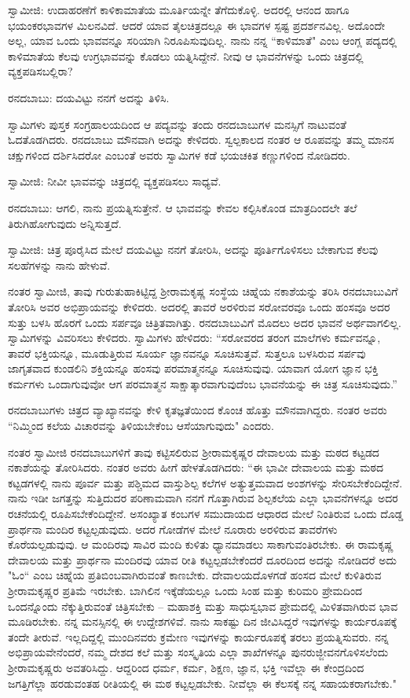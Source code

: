 ಸ್ವಾಮೀಜಿ: ಉದಾಹರಣೆಗೆ ಕಾಳಿಕಾಮಾತೆಯ ಮೂರ್ತಿಯನ್ನೇ ತೆಗೆದುಕೊಳ್ಳಿ. ಅದರಲ್ಲಿ ಆನಂದ ಹಾಗೂ ಭಯಂಕರಭಾವಗಳ ಮಿಲನವಿದೆ. ಆದರೆ ಯಾವ ತೈಲಚಿತ್ರದಲ್ಲೂ ಈ ಭಾವಗಳ ಸ್ಪಷ್ಟ ಪ್ರದರ್ಶನವಿಲ್ಲ. ಅದೊಂದೇ ಅಲ್ಲ, ಯಾವ ಒಂದು ಭಾವವನ್ನೂ ಸರಿಯಾಗಿ ನಿರೂಪಿಸುವುದಿಲ್ಲ. ನಾನು ನನ್ನ “ಕಾಳಿಮಾತೆ" ಎಂಬ ಆಂಗ್ಲ ಪದ್ಯದಲ್ಲಿ ಕಾಳಿಮಾತೆಯ ಕೆಲವು ಉಗ್ರಭಾವವನ್ನು ಕೊಡಲು ಯತ್ನಿಸಿದ್ದೇನೆ. ನೀವು ಆ ಭಾವನೆಗಳನ್ನು ಒಂದು ಚಿತ್ರದಲ್ಲಿ ವ್ಯಕ್ತಪಡಿಸಬಲ್ಲಿರಾ?

ರನದಬಾಬು: ದಯವಿಟ್ಟು ನನಗೆ ಅದನ್ನು ತಿಳಿಸಿ.

ಸ್ವಾಮಿಗಳು ಪುಸ್ತಕ ಸಂಗ್ರಹಾಲಯದಿಂದ ಆ ಪದ್ಯವನ್ನು ತಂದು ರನದಬಾಬುಗಳ ಮನಸ್ಸಿಗೆ ನಾಟುವಂತೆ ಓದತೊಡಗಿದರು. ರನದಬಾಬು ಮೌನವಾಗಿ ಅದನ್ನು ಕೇಳಿದರು. ಸ್ವಲ್ಪಕಾಲದ ನಂತರ ಆ ರೂಪವನ್ನು ತಮ್ಮ ಮಾನಸ ಚಕ್ಷುಗಳಿಂದ ದರ್ಶಿಸಿದರೋ ಎಂಬಂತೆ ಅವರು ಸ್ವಾಮಿಗಳ ಕಡೆ ಭಯಚಕಿತ ಕಣ್ಣುಗಳಿಂದ ನೋಡಿದರು.

ಸ್ವಾಮೀಜಿ: ನೀವೀ ಭಾವವನ್ನು ಚಿತ್ರದಲ್ಲಿ ವ್ಯಕ್ತಪಡಿಸಲು ಸಾಧ್ಯವೆ.

ರನದಬಾಬು: ಆಗಲಿ, ನಾನು ಪ್ರಯತ್ನಿಸುತ್ತೇನೆ. ಆ ಭಾವವನ್ನು ಕೇವಲ ಕಲ್ಪಿಸಿಕೊಂಡ ಮಾತ್ರದಿಂದಲೇ ತಲೆ ತಿರುಗಿಹೋಗುವುದು ಅನ್ನಿಸುತ್ತದೆ.

ಸ್ವಾಮೀಜಿ: ಚಿತ್ರ ಪೂರೈಸಿದ ಮೇಲೆ ದಯವಿಟ್ಟು ನನಗೆ ತೋರಿಸಿ, ಅದನ್ನು ಪೂರ್ತಿಗೊಳಿಸಲು ಬೇಕಾಗುವ ಕೆಲವು ಸಲಹೆಗಳನ್ನು ನಾನು ಹೇಳುವೆ.

ನಂತರ ಸ್ವಾಮೀಜಿ, ತಾವು ಗುರುತುಹಾಕಿಟ್ಟಿದ್ದ ಶ‍್ರೀರಾಮಕೃಷ್ಣ ಸಂಸ್ಥೆಯ ಚಿಹ್ನೆಯ ನಕಾಶೆಯನ್ನು ತರಿಸಿ ರನದಬಾಬುವಿಗೆ ತೋರಿಸಿ ಅವರ ಅಭಿಪ್ರಾಯವನ್ನು ಕೇಳಿದರು. ಅದರಲ್ಲಿ ತಾವರೆ ಅರಳಿರುವ ಸರೋವರವೂ ಒಂದು ಹಂಸವೂ ಅದರ ಸುತ್ತು ಬಳಸಿ ಹೊರಗೆ ಒಂದು ಸರ್ಪವೂ ಚಿತ್ರಿತವಾಗಿತ್ತು. ರನದಬಾಬುವಿಗೆ ಮೊದಲು ಅದರ ಭಾವನೆ ಅರ್ಥವಾಗಲಿಲ್ಲ. ಸ್ವಾಮಿಗಳನ್ನು ವಿವರಿಸಲು ಕೇಳಿದರು. ಸ್ವಾಮಿಗಳು ಹೇಳಿದರು: “ಸರೋವರದ ತರಂಗ ಮಾಲೆಗಳು ಕರ್ಮವನ್ನೂ, ತಾವರೆ ಭಕ್ತಿಯನ್ನೂ, ಮೂಡುತ್ತಿರುವ ಸೂರ್ಯ ಜ್ಞಾನವನ್ನೂ ಸೂಚಿಸುತ್ತವೆ. ಸುತ್ತಲೂ ಬಳಸಿರುವ ಸರ್ಪವು ಜಾಗೃತವಾದ ಕುಂಡಲಿನಿ ಶಕ್ತಿಯನ್ನೂ ಹಂಸವು ಪರಮಾತ್ಮನನ್ನೂ ಸೂಚಿಸುವುವು. ಯಾವಾಗ ಯೋಗ ಜ್ಞಾನ ಭಕ್ತಿ ಕರ್ಮಗಳು ಒಂದಾಗುವುವೋ ಆಗ ಪರಮಾತ್ಮನ ಸಾಕ್ಷಾತ್ಕಾರವಾಗುವುದೆಂಬ ಭಾವನೆಯನ್ನು ಈ ಚಿತ್ರ ಸೂಚಿಸುವುದು.”

ರನದಬಾಬುಗಳು ಚಿತ್ರದ ವ್ಯಾಖ್ಯಾನವನ್ನು ಕೇಳಿ ಕೃತಜ್ಞತೆಯಿಂದ ಕೊಂಚ ಹೊತ್ತು ಮೌನವಾಗಿದ್ದರು. ನಂತರ ಅವರು “ನಿಮ್ಮಿಂದ ಕಲೆಯ ವಿಚಾರವನ್ನು ತಿಳಿಯಬೇಕೆಂಬ ಆಸೆಯಾಗುವುದು" ಎಂದರು.

ನಂತರ ಸ್ವಾಮೀಜಿ ರನದಬಾಬುಗಳಿಗೆ ತಾವು ಕಟ್ಟಿಸಲಿರುವ ಶ‍್ರೀರಾಮಕೃಷ್ಣರ ದೇವಾಲಯ ಮತ್ತು ಮಠದ ಕಟ್ಟಡದ ನಕಾಶೆಯನ್ನು ತೋರಿಸಿದರು. ನಂತರ ಅವರು ಹೀಗೆ ಹೇಳತೊಡಗಿದರು: “ಈ ಭಾವೀ ದೇವಾಲಯ ಮತ್ತು ಮಠದ ಕಟ್ಟಡಗಳಲ್ಲಿ ನಾನು ಪೂರ್ವ ಮತ್ತು ಪಶ್ಚಿಮದ ವಾಸ್ತುಶಿಲ್ಪ ಕಲೆಗಳ ಅತ್ಯುತ್ತಮವಾದ ಅಂಶಗಳನ್ನು ಸೇರಿಸಬೇಕೆಂದಿದ್ದೇನೆ. ನಾನು ಇಡೀ ಜಗತ್ತನ್ನು ಸುತ್ತಿದುದರ ಪರಿಣಾಮವಾಗಿ ನನಗೆ ಗೊತ್ತಾಗಿರುವ ಶಿಲ್ಪಕಲೆಯ ಎಲ್ಲಾ ಭಾವನೆಗಳನ್ನೂ ಅದರ ರಚನೆಯಲ್ಲಿ ರೂಪಿಸಬೇಕೆಂದಿದ್ದೇನೆ. ಅಸಂಖ್ಯಾತ ಕಂಬಗಳ ಸಮುದಾಯದ ಆಧಾರದ ಮೇಲೆ ನಿಂತಿರುವ ಒಂದು ದೊಡ್ಡ ಪ್ರಾರ್ಥನಾ ಮಂದಿರ ಕಟ್ಟಲ್ಪಡುವುದು. ಅದರ ಗೋಡೆಗಳ ಮೇಲೆ ನೂರಾರು ಅರಳಿರುವ ತಾವರೆಗಳು ಕೊರೆಯಲ್ಪಡುವುವು. ಆ ಮಂದಿರವು ಸಾವಿರ ಮಂದಿ ಕುಳಿತು ಧ್ಯಾನಮಾಡಲು ಸಾಕಾಗುವಂತಿರಬೇಕು. ಈ ರಾಮಕೃಷ್ಣ ದೇವಾಲಯ ಮತ್ತು ಪ್ರಾರ್ಥನಾ ಮಂದಿರವು ಯಾವ ರೀತಿ ಕಟ್ಟಲ್ಪಡಬೇಕೆಂದರೆ ದೂರದಿಂದ ಅದನ್ನು ನೋಡಿದರೆ ಅದು "ಓಂ“ ಎಂಬ ಚಿಹ್ನೆಯ ಪ್ರತಿಬಿಂಬವಾಗಿರುವಂತೆ ಕಾಣಬೇಕು. ದೇವಾಲಯದೊಳಗಡೆ ಹಂಸದ ಮೇಲೆ ಕುಳಿತಿರುವ ಶ‍್ರೀರಾಮಕೃಷ್ಣರ ಪ್ರತಿಮೆ ಇರಬೇಕು. ಬಾಗಿಲಿನ ಇಕ್ಕೆಡೆಯಲ್ಲೂ ಒಂದು ಸಿಂಹ ಮತ್ತು ಕುರಿಮರಿ ಪ್ರೇಮದಿಂದ ಒಂದನ್ನೊಂದು ನೆಕ್ಕುತ್ತಿರುವಂತೆ ಚಿತ್ರಿಸಬೇಕು – ಮಹಾಶಕ್ತಿ ಮತ್ತು ಸಾಧುಸ್ವಭಾವ ಪ್ರೇಮದಲ್ಲಿ ಮಿಳಿತವಾಗಿರುವ ಭಾವ ಮೂಡಿರಬೇಕು. ನನ್ನ ಮನಸ್ಸಿನಲ್ಲಿ ಈ ಉದ್ದೇಶಗಳಿವೆ. ನಾನು ಸಾಕಷ್ಟು ದಿನ ಜೀವಿಸಿದ್ದರೆ ಇವುಗಳನ್ನು ಕಾರ್ಯರೂಪಕ್ಕೆ ತಂದೇ ತೀರುವೆ. ಇಲ್ಲದಿದ್ದಲ್ಲಿ ಮುಂದಿನವರು ಕ್ರಮೇಣ ಇವುಗಳನ್ನು ಕಾರ್ಯರೂಪಕ್ಕೆ ತರಲು ಪ್ರಯತ್ನಿಸುವರು. ನನ್ನ ಅಭಿಪ್ರಾಯವೇನೆಂದರೆ, ನಮ್ಮ ದೇಶದ ಕಲೆ ಮತ್ತು ಸಂಸ್ಕೃತಿಯ ಎಲ್ಲಾ ಶಾಖೆಗಳನ್ನೂ ಪುನರುಜ್ಜೀವನಗೊಳಿಸಲೆಂದು ಶ‍್ರೀರಾಮಕೃಷ್ಣರು ಅವತರಿಸಿದ್ದು. ಆದ್ದರಿಂದ ಧರ್ಮ, ಕರ್ಮ, ಶಿಕ್ಷಣ, ಜ್ಞಾನ, ಭಕ್ತಿ ಇವೆಲ್ಲಾ ಈ ಕೇಂದ್ರದಿಂದ ಜಗತ್ತಿಗೆಲ್ಲಾ ಹರಡುವಂತಹ ರೀತಿಯಲ್ಲಿ ಈ ಮಠ ಕಟ್ಟಲ್ಪಡಬೇಕು. ನೀವೆಲ್ಲಾ ಈ ಕೆಲಸಕ್ಕೆ ನನ್ನ ಸಹಾಯಕರಾಗಬೇಕು."

